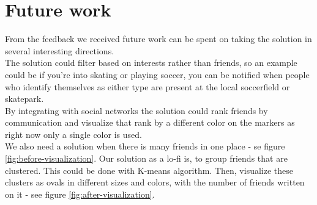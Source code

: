\documentclass[runningheads,a4paper]{llncs}
\begin{document}
\section{Future work}
From the feedback we received future work can be spent on taking the solution in several interesting directions.\\
The solution could filter based on interests rather than friends, so an example could be if you're into skating or playing soccer, you can be notified when people who identify themselves as either type are present at the local soccerfield or skatepark.\\
By integrating with social networks the solution could rank friends by communication and visualize that rank by a different color on the markers as right now only a single color is used.\\
We also need a solution when there is many friends in one place - se figure \ref{fig:before-visualization}. Our solution as a lo-fi is, to group friends that are clustered. This could be done with K-means algorithm. Then, visualize these clusters as ovals in different sizes and colors, with the number of friends written on it - see figure \ref{fig:after-visualization}. 
\end{document}
